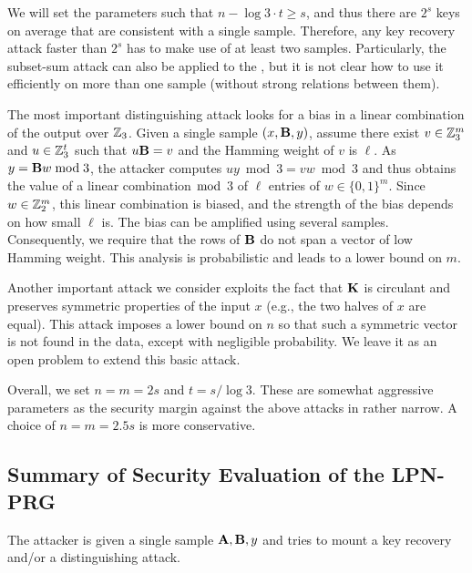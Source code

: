 We will set the parameters such that $n - \log 3 \cdot t \geq s$,
and thus there are $2^s$ keys on average that are consistent with a single sample.
Therefore, any key recovery attack faster than $2^s$ has to make use of at least two samples.
Particularly, the subset-sum attack can also be applied to the \ttwPRF,
but it is not clear how to use it efficiently on more than one sample
(without strong relations between them).

The most important distinguishing attack looks for a bias in a linear combination
of the output over $\mathbb{Z}_3$.
Given a single sample $(x,\mat{B},y)$, assume there exist
$v \in \mathbb{Z}_3^m$ and $u \in \mathbb{Z}_3^t$ such that $u \mat{B} = v$ and the Hamming weight of $v$ is $\ell$.
As $y = \mat{B}w \bmod 3$, the attacker computes $uy \bmod 3 = vw \bmod 3$
and thus obtains the value of a linear combination $\bmod$ 3 of $\ell$ entries of $w \in \{0,1\}^m$.
Since $w \in \mathbb{Z}_2^m$, this linear combination is biased,
and the strength of the bias depends on how small $\ell$ is.
The bias can be amplified using several samples.
Consequently, we require that the rows of $\mat{B}$ do not span a vector of low Hamming weight.
This analysis is probabilistic and leads to a lower bound on $m$.

Another important attack we consider exploits the fact that $\mat{K}$
is circulant and preserves symmetric properties of the input $x$ (e.g., the two halves of $x$ are equal).
This attack imposes a lower bound on $n$ so that such a symmetric vector is not found
in the data, except with negligible probability.
We leave it as an open problem to extend this basic attack.


Overall, we set $n=m=2s$ and $t = s/\log 3$.
These are somewhat aggressive parameters as the security margin against the above attacks
in rather narrow. A choice of $n=m=2.5s$ is more conservative.

\subsection{Summary of Security Evaluation of the LPN-PRG}

The attacker is given a single sample $\mat{A},\mat{B},y$
and tries to mount a key recovery and/or a distinguishing attack.

